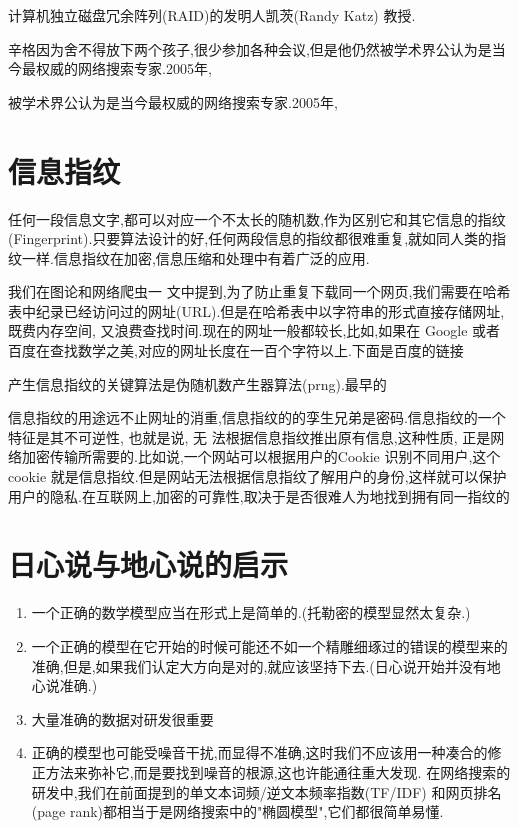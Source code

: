 \documentclass{article}
\begin{document}
计算机独立磁盘冗余阵列(RAID)的发明人凯茨(Randy Katz) 教授.

辛格因为舍不得放下两个孩子,很少参加各种会议,但是他仍然被学术界公认为是当今最权威的网络搜索专家.2005年,

被学术界公认为是当今最权威的网络搜索专家.2005年,

\section{信息指纹}
任何一段信息文字,都可以对应一个不太长的随机数,作为区别它和其它信息的指纹(Fingerprint).只要算法设计的好,任何两段信息的指纹都很难重复,就如同人类的指纹一样.信息指纹在加密,信息压缩和处理中有着广泛的应用.

我们在图论和网络爬虫一 文中提到,为了防止重复下载同一个网页,我们需要在哈希表中纪录已经访问过的网址(URL).但是在哈希表中以字符串的形式直接存储网址,既费内存空间, 又浪费查找时间.现在的网址一般都较长,比如,如果在 Google 或者百度在查找数学之美,对应的网址长度在一百个字符以上.下面是百度的链接

产生信息指纹的关键算法是伪随机数产生器算法(prng).最早的

信息指纹的用途远不止网址的消重,信息指纹的的孪生兄弟是密码.信息指纹的一个特征是其不可逆性, 也就是说, 无 法根据信息指纹推出原有信息,这种性质, 正是网络加密传输所需要的.比如说,一个网站可以根据用户的Cookie 识别不同用户,这个 cookie 就是信息指纹.但是网站无法根据信息指纹了解用户的身份,这样就可以保护用户的隐私.在互联网上,加密的可靠性,取决于是否很难人为地找到拥有同一指纹的

\section{日心说与地心说的启示}
\begin{enumerate}
\item 一个正确的数学模型应当在形式上是简单的.(托勒密的模型显然太复杂.) 
\item 一个正确的模型在它开始的时候可能还不如一个精雕细琢过的错误的模型来的准确,但是,如果我们认定大方向是对的,就应该坚持下去.(日心说开始并没有地心说准确.)
\item 大量准确的数据对研发很重要
\item 正确的模型也可能受噪音干扰,而显得不准确,这时我们不应该用一种凑合的修正方法来弥补它,而是要找到噪音的根源,这也许能通往重大发现. 在网络搜索的研发中,我们在前面提到的单文本词频/逆文本频率指数(TF/IDF) 和网页排名(page rank)都相当于是网络搜索中的"椭圆模型",它们都很简单易懂.
\end{enumerate}
\end{document}
